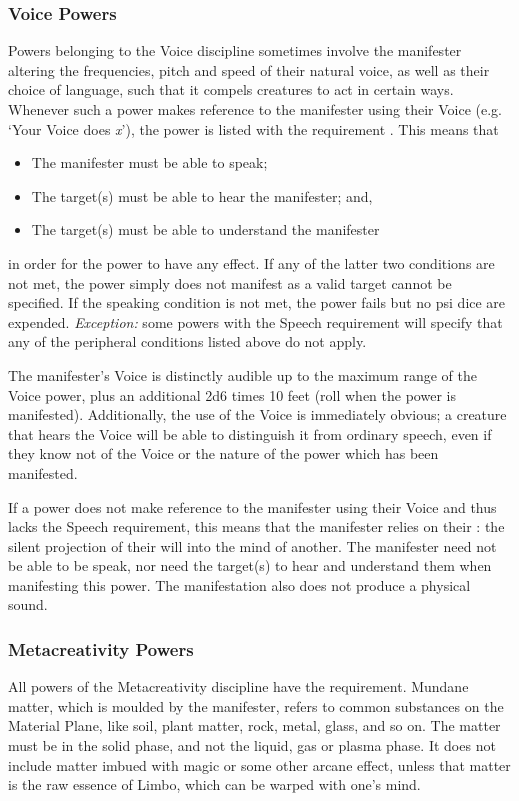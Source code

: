 \subsubsection{Voice Powers}
\label{subs:voice_powers}
Powers belonging to the Voice discipline sometimes involve
the manifester altering the frequencies, pitch and
speed of their natural voice, as well as their choice
of language, such that it compels
creatures to act in certain ways.
Whenever such a power makes reference to the manifester
using their Voice (e.g. `Your Voice does \textit{x}'),
the power is listed with the requirement .
This means that
\begin{itemize}
    \item The manifester must be able to speak;
    \item The target(s) must be able to hear the manifester; and,
    \item The target(s) must be able to understand the manifester
\end{itemize}
in order for the power to have any effect.
If any of the latter two conditions are not met,
the power simply does not manifest as a valid target
cannot be specified.
If the speaking condition is not met,
the power fails but no psi dice are expended.
\textit{Exception:} some powers with the Speech requirement
will specify that any of the peripheral conditions listed above
do not apply.

The manifester's Voice is distinctly audible
up to the maximum range of the Voice power,
plus an additional 2d6 times 10 feet
(roll when the power is manifested).
Additionally, the use of the Voice is immediately obvious;
a creature that hears the Voice will be able to distinguish
it from ordinary speech,
even if they know not of the Voice or
the nature of the power which has been manifested.

If a power does not make reference to the manifester
using their Voice and thus lacks the Speech requirement,
this means that the manifester relies on their
: the silent projection of their will
into the mind of another.
The manifester need not be able to be speak,
nor need the target(s) to hear and understand them
when manifesting this power.
The manifestation also does not produce a physical sound.

\subsubsection{Metacreativity Powers}
All powers of the Metacreativity discipline have the
 requirement.
Mundane matter, which is moulded by the manifester,
refers to common substances on the
Material Plane,
like soil, plant matter, rock, metal,
glass, and so on.
The matter must be in the solid phase,
and not the liquid, gas or plasma phase.
It does not include matter imbued with magic
or some other arcane effect,
unless that matter is the raw essence of Limbo,
which can be warped with one's mind.

